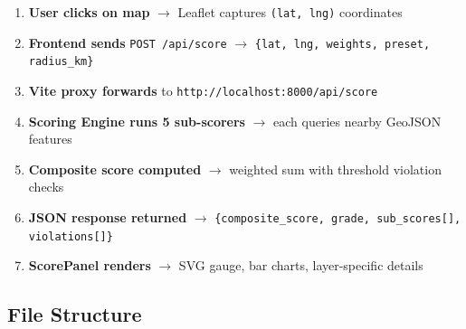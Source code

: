 \documentclass[12pt, a4paper]{article}
\begin{document}
\begin{enumerate}[leftmargin=2em]
    \item \textbf{User clicks on map} $\rightarrow$ Leaflet captures \texttt{(lat, lng)} coordinates
    \item \textbf{Frontend sends} \texttt{POST /api/score} $\rightarrow$ \texttt{\{lat, lng, weights, preset, radius\_km\}}
    \item \textbf{Vite proxy forwards} to \texttt{http://localhost:8000/api/score}
    \item \textbf{Scoring Engine runs 5 sub-scorers} $\rightarrow$ each queries nearby GeoJSON features
    \item \textbf{Composite score computed} $\rightarrow$ weighted sum with threshold violation checks
    \item \textbf{JSON response returned} $\rightarrow$ \texttt{\{composite\_score, grade, sub\_scores[], violations[]\}}
    \item \textbf{ScorePanel renders} $\rightarrow$ SVG gauge, bar charts, layer-specific details
\end{enumerate}

\subsection{File Structure}
\end{document}
